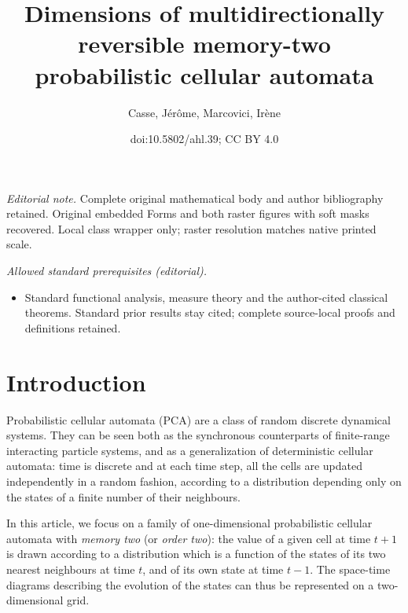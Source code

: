 \documentclass[10pt]{amsart}
\title{Dimensions of multidirectionally reversible memory-two probabilistic cellular automata}
\author{Casse, Jérôme, Marcovici, Irène}
\date{doi:10.5802/ahl.39; CC BY 4.0}
\theoremstyle{definition}\newtheorem{defi}[theo]{Definition}\newtheorem{rema}[theo]{Remark}\newtheorem{exam}[theo]{Example}\newtheorem{exem}[theo]{Example}\newtheorem{nota}[theo]{Notation}
\newcounter{a}
\begin{document}
\maketitle
\noindent\textit{Editorial note.} Complete original mathematical body and author bibliography retained. Original embedded Forms and both raster figures with soft masks recovered. Local class wrapper only; raster resolution matches native printed scale.\par\medskip
\noindent\textit{Allowed standard prerequisites (editorial).}\begin{itemize}
\item Standard functional analysis, measure theory and the author-cited classical theorems. Standard prior results stay cited; complete source-local proofs and definitions retained.
\end{itemize}\medskip

\section{Introduction}

Probabilistic cellular automata (PCA) are a class of random discrete dynamical systems. They can be seen both as the synchronous counterparts of finite-range interacting particle systems, and as a generalization of deterministic cellular automata: time is discrete and at each time step, all the cells are updated independently in a random fashion, according to a distribution depending only on the states of a finite number of their neighbours.

In this article, we focus on a family of one-dimensional probabilistic cellular automata with \emph{memory two} (or \emph{order two}): the value of a given cell at time $t+1$ is drawn according to a distribution which is a function of the states of its two nearest neighbours at time $t$, and of its own state at time $t-1$. The space-time diagrams describing the evolution of the states can thus be represented on a two-dimensional grid.
\end{document}
